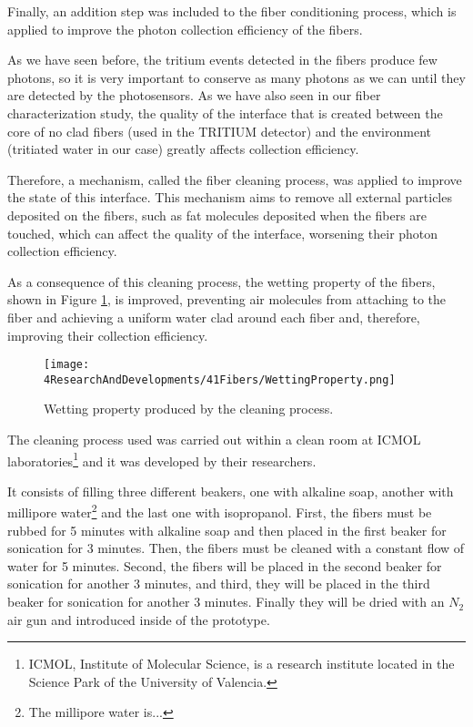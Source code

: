 Finally, an addition step was included to the fiber conditioning process, which is applied to improve the photon collection efficiency of the fibers. 

As we have seen before, the tritium events detected in the fibers produce few photons, so it is very important to conserve as many photons as we can until they are detected by the photosensors. As we have also seen in our fiber characterization study, the quality of the interface that is created between the core of no clad fibers (used in the TRITIUM detector) and the environment (tritiated water in our case) greatly affects collection efficiency.

Therefore, a mechanism, called the fiber cleaning process, was applied to improve the state of this interface. This mechanism aims to remove all external particles deposited on the fibers, such as fat molecules deposited when the fibers are touched, which can affect the quality of the interface, worsening their photon collection efficiency. 

As a consequence of this cleaning process, the wetting property of the fibers, shown in Figure \ref{fig:WettingProperty}, is improved, preventing air molecules from attaching to the fiber and achieving a uniform water clad around each fiber and, therefore, improving their collection efficiency. 


\begin{figure}[h]
\centering
\texttt{[image: 4ResearchAndDevelopments/41Fibers/WettingProperty.png]}
\caption{Wetting property produced by the cleaning process. \cite{}\label{fig:WettingProperty}}
\end{figure}


The cleaning process used was carried out within a clean room at ICMOL laboratories\footnote{ICMOL, Institute of Molecular Science, is a research institute located in the Science Park of the University of Valencia.} and it was developed by their researchers.

It consists of filling three different beakers, one with alkaline soap, another with millipore water\footnote{The millipore water is...} and the last one with isopropanol. First, the fibers must be rubbed for 5 minutes with alkaline soap and then placed in the first beaker for sonication for 3 minutes. Then, the fibers must be cleaned with a constant flow of water for 5 minutes. Second, the fibers will be placed in the second beaker for sonication for another 3 minutes, and third, they will be placed in the third beaker for sonication for another 3 minutes. Finally they will be dried with an $N_2$ air gun and introduced inside of the prototype.


